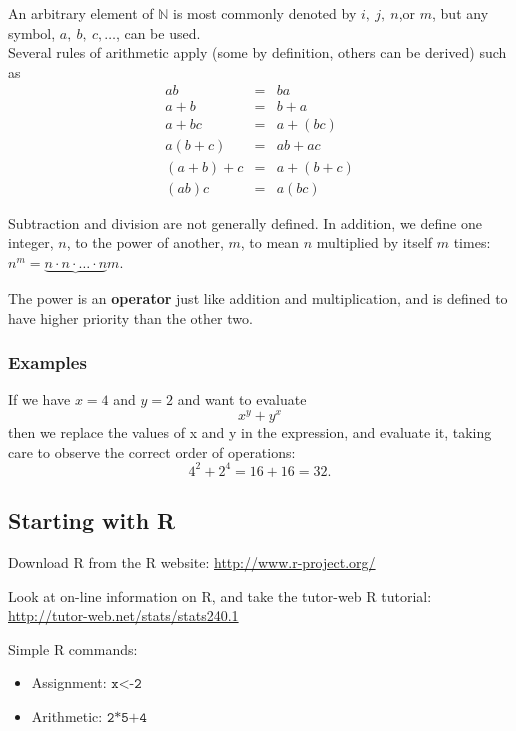 \documentclass[12pt,a4paper]{article}
\theoremstyle{regla}
\theoremstyle{remark}
\theoremstyle{definition}
\theoremstyle{nonumberbreak}
\begin{document}
An arbitrary element of $\mathbb{N}$ is most commonly denoted by $i,\ j,\ n$,or $m$, but any symbol, $a,\ b,\ c, \ldots$, can be used.\\

Several rules of arithmetic apply (some by definition, others can be derived) such as
\begin{eqnarray*}
ab&=&ba\\
a+b&=&b+a\\
a+bc&=&a+(bc)\\
a(b+c)&=&ab+ac\\
(a+b)+c&=&a+(b+c)\\
(ab)c&=&a(bc)
\end{eqnarray*}

Subtraction and division are not generally defined. In addition, we define one integer, $n$, to the power of another, $m$, to mean $n$ multiplied by itself $m$ times: $n^m=\underbrace{n\cdot n \cdot \ldots \cdot n}{m}$. 

\begin{defn}
The power is an \textbf{operator} just like addition and multiplication, and is defined to have higher priority than the other two.
\end {defn}

\subsubsection{Examples}
\begin{xmpl} 
If we have $x=4$ and $y= 2$ and want to evaluate $$x^y+y^x$$
then we  replace the values of x and y in the expression, and evaluate it,
taking care to observe the correct order of operations:
$$4^2+2^4=16+16=32.$$
\end{xmpl} 


\subsection{Starting with R}
\begin{fbox}
\begin{minipage}{0.97\textwidth}
Download R from the R website: \href{http://www.r-project.org/}{http://www.r-project.org/}

Look at on-line information on R, and take the tutor-web R tutorial: \href{http://tutor-web.net/stats/stats240.1}{http://tutor-web.net/stats/stats240.1}

Simple R commands: 

\begin{itemize}
\item Assignment: $\texttt{x<-2}$
\item Arithmetic: $\texttt{2*5+4}$
\end{itemize}
\end{minipage}
\end{fbox}
\end{document}
